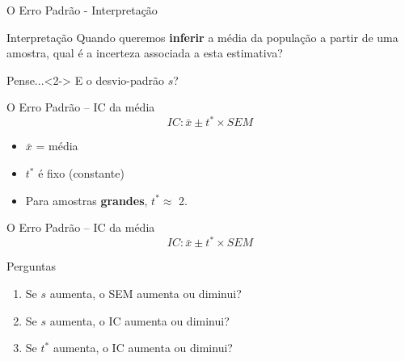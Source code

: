 \documentclass{beamer}
\begin{document}
\begin{frame}{\scriptsize O Erro Padrão - Interpretação}
  \begin{block}{Interpretação}
    \footnotesize
    Quando queremos {\bf inferir} a média da população a partir de uma amostra, qual é a incerteza associada a esta estimativa?
  \end{block}
  \begin{block}{Pense...}<2->
    \footnotesize
    E o desvio-padrão $s$?
  \end{block}
\end{frame}

\begin{frame}{\scriptsize O Erro Padrão -- IC da média}
  \begin{displaymath}
    IC: \bar{x} \pm t^{*} \times SEM
  \end{displaymath}
  \begin{itemize}
    \footnotesize
  \item $\bar{x}$ = média
    \medskip
  \item $t^{*}$ é fixo ({\tiny constante})
    \medskip
  \item Para amostras {\bf grandes}, $t^{*} \approx$ 2.
  \end{itemize}
\end{frame}

\begin{frame}{\scriptsize O Erro Padrão -- IC da média}
  \begin{displaymath}
    IC: \bar{x} \pm t^{*} \times SEM
  \end{displaymath}
  \begin{block}{Perguntas}
    \begin{enumerate}
      \footnotesize
    \item<1-> Se $s$ aumenta, o SEM aumenta ou diminui?
    \item<2-> Se $s$ aumenta, o IC aumenta ou diminui?
    \item<3-> Se $t^{*}$ aumenta, o IC aumenta ou diminui?
    \end{enumerate}
  \end{block}
\end{frame}
\end{document}
